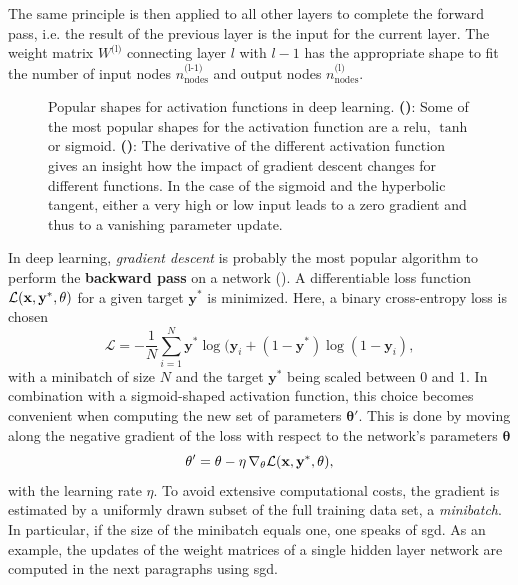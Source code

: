 The same principle is then applied to all other layers to complete the forward pass, i.e. the result of the previous layer is the input for the current layer. The weight matrix $W^{\text{(l)}}$ connecting layer $l$ with $l-1$ has the appropriate shape to fit the number of input nodes $n^{\text{(l-1)}}_\text{nodes}$ and output nodes $n^{\text{(l)}}_\text{nodes}$.

\begin{figure}
	\begin{subfigure}[c]{0.5\textwidth}
		\centering
		\caption{}
		\label{dltransfer}
	\end{subfigure}
	\begin{subfigure}[c]{0.5\textwidth}
		\centering
		\caption{}
		\label{dltransfergradient}
	\end{subfigure}
	\caption[Popular shapes for activation functions in deep learning.]{Popular shapes for activation functions in deep learning. \textbf{()}: Some of the most popular shapes for the activation function are a \gls{relu}, $\tanh$ or sigmoid. \textbf{()}: The derivative of the different activation function gives an insight how the impact of gradient descent changes for different functions. In the case of the sigmoid and the hyperbolic tangent, either a very high or low input leads to a zero gradient and thus to a vanishing parameter update.}
	\label{deeplearning_activation_functions}
\end{figure}

In deep learning, \emph{gradient descent} is probably the most popular algorithm to perform the \textbf{backward pass} on a network (\citealp{Goodfellow-et-al-2016}). A differentiable loss function $\mathcal{L}(\mathbf{\mathbf{x}, y^*, \theta})$ for a given target $\textbf{y}^*$ is minimized. Here, a binary cross-entropy loss is chosen
\begin{equation*}
\mathcal{L} = - \frac{1}{N} \sum_{i=1}^N \textbf{y}^* \log(\textbf{y}_i + (1-\textbf{y}^*) \log(1 - \textbf{y}_i), 
\end{equation*}
with a minibatch of size $N$ and the target $\textbf{y}^*$ being scaled between 0 and 1. In combination with a sigmoid-shaped activation function, this choice becomes convenient when computing the new set of parameters $\mathbf{\theta}'$. This is done by moving along the negative gradient of the loss with respect to the network's parameters $\mathbf{\theta}$
\begin{equation}
\mathbf{\theta'} = \mathbf{\theta} - \eta \, \nabla_\theta\mathcal{L}(\mathbf{\mathbf{x}, y^*, \mathbf{\theta}}),
\label{stochasticgradientdescent}
\end{equation}
with the learning rate $\eta$. To avoid extensive computational costs, the gradient is estimated by a uniformly drawn subset of the full training data set, a \emph{minibatch}. In particular, if the size of the minibatch equals one, one speaks of \gls{sgd}. As an example, the updates of the weight matrices of a single hidden layer network are computed in the next paragraphs using \gls{sgd}.

